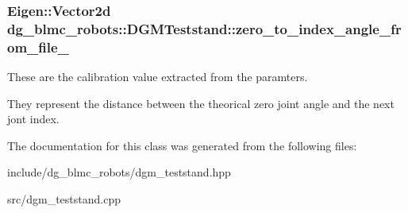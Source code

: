 \subsubsection[{\texorpdfstring{zero\+\_\+to\+\_\+index\+\_\+angle\+\_\+from\+\_\+file\+\_\+}{zero_to_index_angle_from_file_}}]{\setlength{\rightskip}{0pt plus 5cm}Eigen\+::\+Vector2d dg\+\_\+blmc\+\_\+robots\+::\+D\+G\+M\+Teststand\+::zero\+\_\+to\+\_\+index\+\_\+angle\+\_\+from\+\_\+file\+\_\+\hspace{0.3cm}{\ttfamily [private]}}\hypertarget{classdg__blmc__robots_1_1DGMTeststand_a788ef9391e891af10ab9b76f18139e5c}{}\label{classdg__blmc__robots_1_1DGMTeststand_a788ef9391e891af10ab9b76f18139e5c}


These are the calibration value extracted from the paramters. 

They represent the distance between the theorical zero joint angle and the next jont index. 

The documentation for this class was generated from the following files\+:\begin{DoxyCompactItemize}
\item 
include/dg\+\_\+blmc\+\_\+robots/dgm\+\_\+teststand.\+hpp\item 
src/dgm\+\_\+teststand.\+cpp\end{DoxyCompactItemize}
